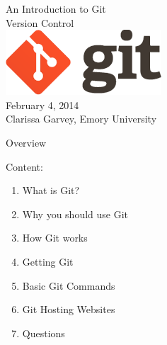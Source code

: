 \documentclass[xcolor=dvipsnames]{beamer}
\begin{document}
\begin{frame}
\begin{center}
\vspace{5mm}
{\huge An Introduction to Git\\ \vspace{1mm} Version Control}\\
\vspace{7mm}
\includegraphics[scale=.3]{gitlogo}\\
\vspace{8mm}
{\large February 4, 2014}\\
Clarissa Garvey, Emory University
\end{center}
\end{frame}

\begin{frame}{Overview}

{\large Content:}
\begin{enumerate}
\item What is Git?
\item Why you should use Git %
\item How Git works
\item Getting Git
\item Basic Git Commands
\item Git Hosting Websites
\item Questions
\end{enumerate}
\end{frame}
\end{document}
